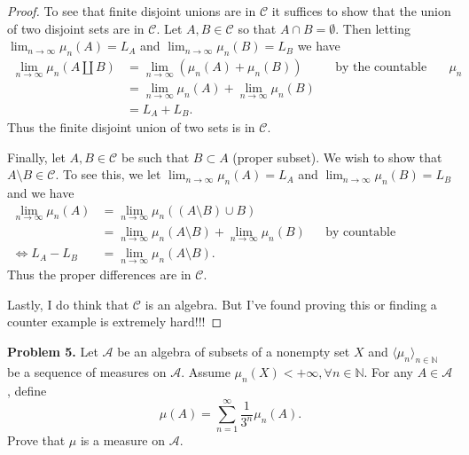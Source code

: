 \documentclass[leqno]{article}
\theoremstyle{nonumberplain}
\newtheorem{proof}{Proof}
\begin{document}
\begin{proof}
To see that finite disjoint unions are in $\mathcal{C}$ it suffices to show that the union of two disjoint sets are in $\mathcal{C}$.  Let $A,B\in \mathcal{C}$ so that $A\cap B=\emptyset$.  Then letting $\lim_{n\to \infty} \mu_n(A)=L_A$ and $\lim_{n\to \infty} \mu_n(B)=L_B$ we have 
\begin{align*}
\lim_{n\to \infty} \mu_n (A\coprod B) &= \lim_{n\to \infty} (\mu_n(A)+\mu_n(B)) &&\textrm{by the countable (and hence finite) additivity of $\mu_n$}\\
&= \lim_{n\to \infty} \mu_n(A)+\lim_{n\to \infty} \mu_n(B)\\
&= L_A+L_B.
\end{align*}
Thus the finite disjoint union of two sets is in $\mathcal{C}$. 

Finally, let $A,B\in \mathcal{C}$ be such that $B\subset A$ (proper subset). We wish to show that $A\setminus B \in \mathcal{C}$.  To see this, we let $\lim_{n\to \infty} \mu_n(A)=L_A$ and $\lim_{n\to \infty} \mu_n(B)=L_B$ and we have
\begin{align*}
\lim_{n\to \infty} \mu_n(A)&=\lim_{n\to \infty} \mu_n ((A\setminus B)\cup B)\\
&= \lim_{n\to \infty}\mu_n(A\setminus B)+\lim_{n\to \infty} \mu_n(B) &&\textrm{by countable additivity}\\
\iff L_A-L_B&= \lim_{n\to \infty} \mu_n(A\setminus B).
\end{align*}
Thus the proper differences are in $\mathcal{C}$.  

Lastly, I do think that $\mathcal{C}$ is an algebra.  But I've found proving this or finding a counter example is extremely hard!!!
\end{proof}

\pagebreak



\noindent\textbf{Problem 5.} \quad
 Let $ \mathcal{A} $ be an algebra of subsets of a nonempty set $ X $
and $ \langle \mu_n \rangle_{n \in \mathbb{N}} $
be a sequence of measures on $ \mathcal{A} $.
Assume $ \mu_n(X)<+\infty, \forall n \in \mathbb{N} $.
For any $ A \in \mathcal{A} $, define
$$
  \mu(A) = \sum_{n=1}^\infty \frac{1}{3^n} \mu_n(A).
$$
Prove that $ \mu $ is a measure on $ \mathcal{A} $.
\end{document}
